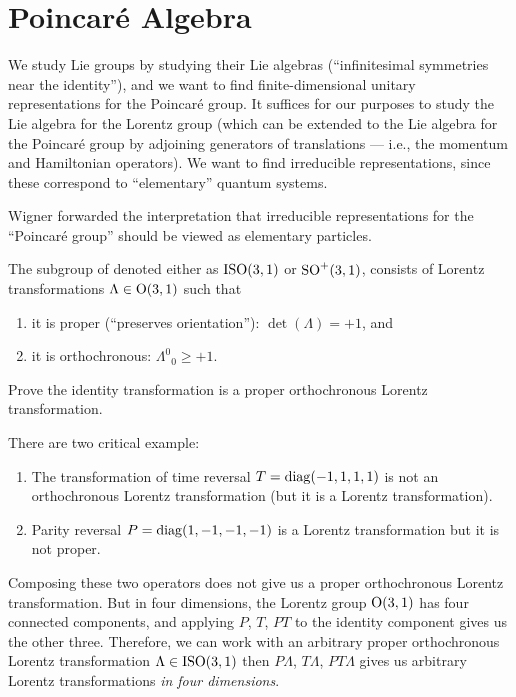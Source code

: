 \section{Poincar\'e Algebra}

We study Lie groups by studying their Lie algebras (``infinitesimal
symmetries near the identity''), and we want to find finite-dimensional
unitary representations for the Poincar\'e group. It suffices for our
purposes to study the Lie algebra for the Lorentz group (which can be
extended to the Lie algebra for the Poincar\'e group by adjoining
generators of translations --- i.e., the momentum and Hamiltonian
operators). We want to find irreducible representations, since these
correspond to ``elementary'' quantum systems.

Wigner forwarded the interpretation that irreducible representations for
the ``Poincar\'e group'' should be viewed as elementary
particles.

\begin{definition}
The subgroup of 
denoted either as $\mathrm{ISO}(3,1)$ or $\operatorname{SO}^{+}(3,1)$, consists of Lorentz
transformations $\Lambda\in\mathrm{O}(3,1)$ such that
\begin{enumerate}
\item it is proper (``preserves orientation''): $\det(\Lambda)=+1$, and
\item it is orthochronous: ${\Lambda^{0}}_{0}\geq+1$.
\end{enumerate}
\end{definition}
\begin{exercise}
Prove the identity transformation is a proper orthochronous Lorentz
transformation. 
\end{exercise}

There are two critical example:
\begin{enumerate}
\item The transformation of time reversal $T=\operatorname{diag}(-1,1,1,1)$ is not an
  orthochronous Lorentz transformation (but it is a Lorentz transformation).
\item Parity reversal $P=\operatorname{diag}(1,-1,-1,-1)$ is a Lorentz transformation
  but it is not proper.
\end{enumerate}
Composing these two operators does not give us a proper orthochronous
Lorentz transformation. But in four dimensions, the Lorentz group
$\mathrm{O}(3,1)$ has four connected components, and applying $P$, $T$, $PT$ to
the identity component gives us the other three. Therefore, we can work
with an arbitrary proper orthochronous Lorentz transformation
$\Lambda\in\mathrm{ISO}(3,1)$ then $P\Lambda$, $T\Lambda$, $PT\Lambda$ gives us
arbitrary Lorentz transformations \emph{in four dimensions}.

